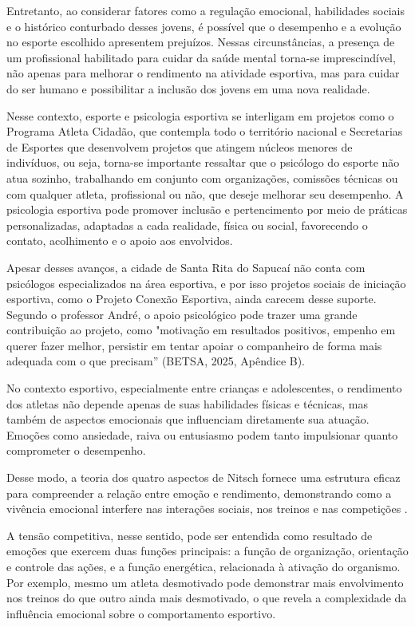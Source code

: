 \begin{Desenvolvimento}
Entretanto, ao considerar fatores como a regulação emocional, habilidades sociais e o histórico conturbado desses jovens, é possível que o desempenho e a evolução no esporte escolhido apresentem prejuízos. Nessas circunstâncias, a presença de um profissional habilitado para cuidar da saúde mental torna-se imprescindível, não apenas para melhorar o rendimento na atividade esportiva, mas para cuidar do ser humano e possibilitar a inclusão dos jovens em uma nova realidade.

Nesse contexto, esporte e psicologia esportiva se interligam em projetos como o Programa Atleta Cidadão, que contempla todo o território nacional e Secretarias de Esportes que desenvolvem projetos que atingem núcleos menores de indivíduos, ou seja, torna-se importante  ressaltar que o psicólogo do esporte não atua sozinho, trabalhando em conjunto com organizações, comissões técnicas ou com qualquer atleta, profissional ou não, que deseje melhorar seu desempenho. A psicologia esportiva pode promover inclusão e pertencimento por meio de práticas personalizadas, adaptadas a cada realidade, física ou social, favorecendo o contato, acolhimento e o apoio aos envolvidos.

Apesar desses avanços, a cidade de Santa Rita do Sapucaí não conta com psicólogos especializados na área esportiva, e por isso projetos sociais de iniciação esportiva, como o Projeto Conexão Esportiva, ainda carecem desse suporte. Segundo o professor André, o apoio psicológico pode trazer uma grande contribuição ao projeto, como "motivação em resultados positivos, empenho em querer fazer melhor, persistir em tentar apoiar o companheiro de forma mais adequada com o que precisam” (BETSA, 2025, Apêndice B).

No contexto esportivo, especialmente entre crianças e adolescentes, o rendimento dos atletas não depende apenas de suas habilidades físicas e técnicas, mas também de aspectos emocionais que influenciam diretamente sua atuação. Emoções como ansiedade, raiva ou entusiasmo podem tanto impulsionar quanto comprometer o desempenho.

Desse modo, a teoria dos quatro aspectos de Nitsch fornece uma estrutura eficaz para compreender a relação entre emoção e rendimento, demonstrando como a vivência emocional interfere nas interações sociais, nos treinos e nas competições .

A tensão competitiva, nesse sentido, pode ser entendida como resultado de emoções que exercem duas funções principais: a função de organização, orientação e controle das ações, e a função energética, relacionada à ativação do organismo. Por exemplo, mesmo um atleta desmotivado pode demonstrar mais envolvimento nos treinos do que outro ainda mais desmotivado, o que revela a complexidade da influência emocional sobre o comportamento esportivo.


\end{Desenvolvimento}
